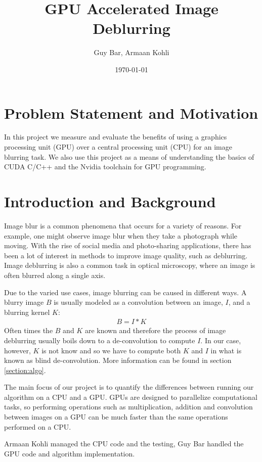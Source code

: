 \documentclass{article}
\title{GPU Accelerated Image Deblurring}
\author{Guy Bar, Armaan Kohli}
\date{\today}
\begin{document}
\maketitle
\tableofcontents
\newpage

\section{Problem Statement and Motivation}

In this project we measure and evaluate the benefits of using a graphics processing unit (GPU) over a central processing unit (CPU)
for an image blurring task. We also use this project as a means of understanding the basics of CUDA C/C++ and the Nvidia toolchain for GPU programming. 


\section{Introduction and Background}

Image blur is a common phenomena that occurs
for a variety of reasons. For example, one might observe image blur when they take a photograph while moving. With the rise of social media and photo-sharing applications, there has been a lot of interest in methods to improve image quality, such as deblurring. Image deblurring is also a common task in optical microscopy, where an image is often blurred along a single axis. 

Due to the varied use cases,
image blurring can be caused in different ways.
A blurry image $B$ is usually modeled as a convolution
between an image, $I$, and a blurring kernel $K$:
\begin{eqnarray}
    B = I * K
\end{eqnarray}
Often times the $B$ and $K$ are known and therefore the
process of image deblurring usually boils down to a 
de-convolution to compute $I$.
In our case, however, $K$ is not know and so we have to
compute both $K$ and $I$ in what is known as blind de-convolution.
More information can be found in section \ref{section:algo}.

The main focus of our project is to quantify the 
differences between running our algorithm on a CPU and a GPU. GPUs are designed to parallelize computational tasks, so performing operations such as multiplication, addition and convolution between images on a GPU can be much faster than the same operations performed on a CPU.

Armaan Kohli managed the CPU code and the testing, Guy Bar handled the GPU code and algorithm implementation. 
\end{document}
